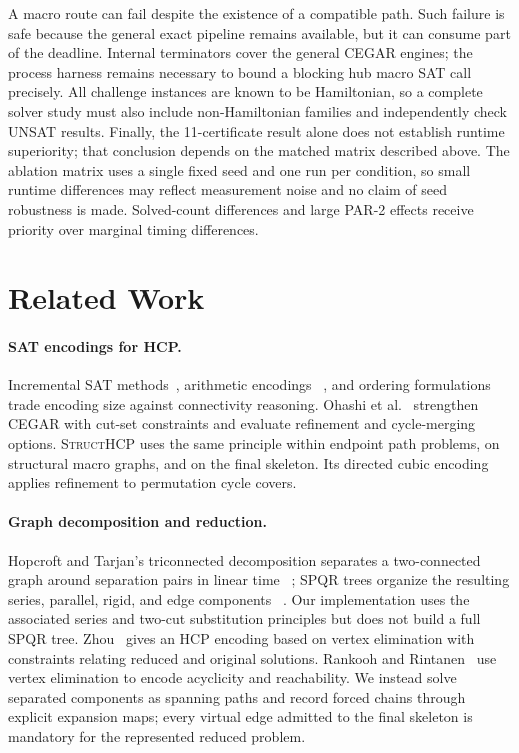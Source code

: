 \documentclass[sigconf,anonymous]{aamas}
\newcommand{\method}{\textsc{StructHCP}\xspace}
\begin{document}
A macro route can fail despite the existence of a compatible path. Such
failure is safe because the general exact pipeline remains available,
but it can consume part of the deadline. Internal terminators cover the
general CEGAR engines; the process harness remains necessary to bound a
blocking hub macro SAT call precisely. All challenge instances are known
to be Hamiltonian, so a complete solver study must also include
non-Hamiltonian families and independently check UNSAT results. Finally,
the 11-certificate result alone does not establish runtime superiority;
that conclusion depends on the matched matrix described above.
The ablation matrix uses a single fixed seed and one run per condition,
so small runtime differences may reflect measurement noise and no claim
of seed robustness is made. Solved-count differences and large PAR-2
effects receive priority over marginal timing differences.

\section{Related Work}
\label{sec:related-work}

\paragraph{SAT encodings for HCP.}
Incremental SAT methods~\cite{soh2014incremental}, arithmetic encodings
~\cite{heule2021chinese}, and ordering formulations
~\cite{zhou2020encoding} trade encoding size against connectivity
reasoning. Ohashi et al.~\cite{ohashi2025cutset} strengthen CEGAR with
cut-set constraints and evaluate refinement and cycle-merging options.
\method uses the same principle within endpoint path problems, on
structural macro graphs, and on the final skeleton. Its directed cubic
encoding applies refinement to permutation cycle covers.

\paragraph{Graph decomposition and reduction.}
Hopcroft and Tarjan's triconnected decomposition separates a
two-connected graph around separation pairs in linear time
~\cite{hopcroft1973triconnected}; SPQR trees organize the resulting
series, parallel, rigid, and edge components
~\cite{dibattista1996spqr}. Our implementation uses
the associated series and two-cut substitution principles but does not
build a full SPQR tree. Zhou~\cite{zhou2024vertex} gives an HCP encoding
based on vertex elimination with constraints relating reduced and
original solutions. Rankooh and Rintanen~\cite{rankooh2022elimination}
use vertex elimination to encode acyclicity and reachability. We instead
solve separated components as spanning paths and record forced chains
through explicit expansion maps; every virtual edge admitted to the
final skeleton is mandatory for the represented reduced problem.
\end{document}
